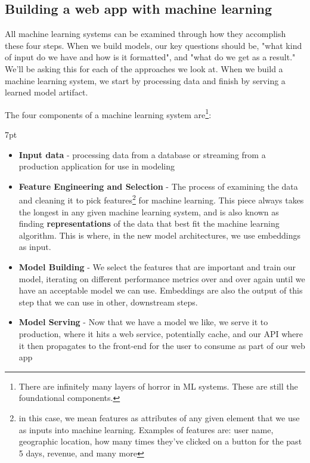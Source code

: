 \documentclass[11pt, table]{diazessay} %
\newenvironment{formal}{%
  \def\FrameCommand{%
	\hspace{1pt}%
	{\color{w_lightblue}\vrule width 2pt}%
	{\color{formalshade}\vrule width 4pt}%
	\colorbox{formalshade}%
  }%
  \MakeFramed{\advance\hsize-\width\FrameRestore}%
  \noindent\hspace{-4.55pt}%
  \begin{adjustwidth}{}{7pt}%
  \vspace{2pt}\vspace{2pt}%
}
{%
  \vspace{2pt}\end{adjustwidth}\endMakeFramed%
}
\begin{document}
\begin{sloppypar}
\subsection{Building a web app with machine learning}

All machine learning systems can be examined through how they accomplish these four steps. When we build models, our key questions should be, "what kind of input do we have and how is it formatted", and "what do we get as a result." We'll be asking this for each of the approaches we look at.  When we build a machine learning system, we start by processing data and finish by serving a learned model artifact.

The four components of a machine learning system are\footnote{There are infinitely many layers of horror in ML systems\citep{kreuzberger2022machine}. These are still the foundational components.}:

\begin{formal}
\begin{itemize}
  \item \textbf{Input data} - processing data from a database or streaming from a production application for use in modeling
  \item \textbf{Feature Engineering and Selection} - The process of examining the data and cleaning it to pick features\footnote{in this case, we mean features as attributes of any given element that we use as inputs into machine learning. Examples of features are: user name, geographic location, how many times they've clicked on a button for the past 5 days, revenue, and many more} for machine learning. This piece always takes the longest in any given machine learning system, and is also known as finding \textbf{representations}\citep{bengio2013representation} of the data that best fit the machine learning algorithm. This is where, in the new model architectures, we use embeddings as input.
  \item \textbf{Model Building} - We select the features that are important and train our model, iterating on different performance metrics over and over again until we have an acceptable model we can use. Embeddings are also the output of this step that we can use in other, downstream steps.
  \item \textbf{Model Serving} - Now that we have a model we like, we serve it to production, where it hits a web service, potentially cache, and our API where it then propagates to the front-end for the user to consume as part of our web app
\end{itemize}
\end{formal}


\end{sloppypar}
\end{document}
